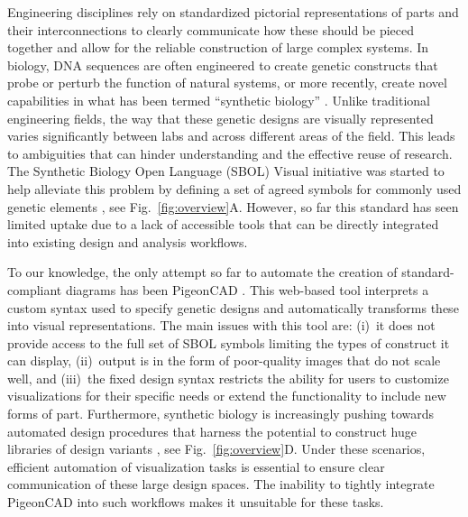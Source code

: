 \documentclass{bioinfo}
\begin{document}
Engineering disciplines rely on standardized pictorial representations of parts and their interconnections to clearly communicate how these should be pieced together and allow for the reliable construction of large complex systems. In biology, DNA sequences are often engineered to create genetic constructs that probe or perturb the function of natural systems, or more recently, create novel capabilities in what has been termed ``synthetic biology'' \citep{Church14a}. Unlike traditional engineering fields, the way that these genetic designs are visually represented varies significantly between labs and across different areas of the field. This leads to ambiguities that can hinder understanding and the effective reuse of research. The Synthetic Biology Open Language (SBOL) Visual initiative was started to help alleviate this problem by defining a set of agreed symbols for commonly used genetic elements \citep{Quinn13a}, see Fig.~\ref{fig:overview}A. However, so far this standard has seen limited uptake due to a lack of accessible tools that can be directly integrated into existing design and analysis workflows.

To our knowledge, the only attempt so far to automate the creation of standard-compliant diagrams has been PigeonCAD \citep{Bhatia13a}. This web-based tool interprets a custom syntax used to specify genetic designs and automatically transforms these into visual representations. The main issues with this tool are: (i)~it does not provide access to the full set of SBOL symbols limiting the types of construct it can display, (ii)~output is in the form of poor-quality images that do not scale well, and (iii)~the fixed design syntax restricts the ability for users to customize visualizations for their specific needs or extend the functionality to include new forms of part. Furthermore, synthetic biology is increasingly pushing towards automated design procedures that harness the potential to construct huge libraries of design variants \citep{Smanski14a,Bilitchenko11a}, see Fig.~\ref{fig:overview}D. Under these scenarios, efficient automation of visualization tasks is essential to ensure clear communication of these large design spaces. The inability to tightly integrate PigeonCAD into such workflows makes it unsuitable for these tasks.
\end{document}
